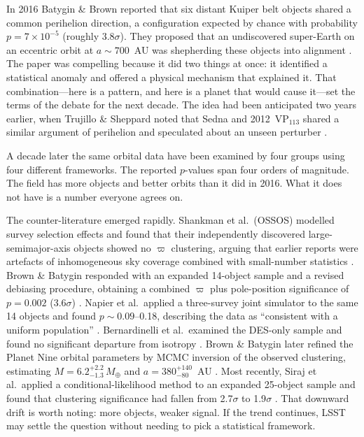 \documentclass[usenatbib]{mnras}
\begin{document}
In 2016 Batygin \& Brown reported that six distant Kuiper belt objects shared a common perihelion direction, a configuration expected by chance with probability $p=7\times10^{-5}$ (roughly 3.8$\sigma$). They proposed that an undiscovered super-Earth on an eccentric orbit at $a\sim700$~AU was shepherding these objects into alignment \cite{batygin2016}. The paper was compelling because it did two things at once: it identified a statistical anomaly and offered a physical mechanism that explained it. That combination---here is a pattern, and here is a planet that would cause it---set the terms of the debate for the next decade. The idea had been anticipated two years earlier, when Trujillo \& Sheppard noted that Sedna and 2012~VP$_{113}$ shared a similar argument of perihelion and speculated about an unseen perturber \cite{trujillo2014}.

A decade later the same orbital data have been examined by four groups using four different frameworks. The reported $p$-values span four orders of magnitude. The field has more objects and better orbits than it did in 2016. What it does not have is a number everyone agrees on.

The counter-literature emerged rapidly. Shankman et al.\ (OSSOS) modelled survey selection effects and found that their independently discovered large-semimajor-axis objects showed no $\varpi$ clustering, arguing that earlier reports were artefacts of inhomogeneous sky coverage combined with small-number statistics \cite{shankman2017}. Brown \& Batygin responded with an expanded 14-object sample and a revised debiasing procedure, obtaining a combined $\varpi$ plus pole-position significance of $p=0.002$ (3.6$\sigma$) \cite{brown2019}. Napier et al.\ applied a three-survey joint simulator to the same 14 objects and found $p\sim0.09$--0.18, describing the data as ``consistent with a uniform population'' \cite{napier2021}. Bernardinelli et al.\ examined the DES-only sample and found no significant departure from isotropy \cite{bernardinelli2020}. Brown \& Batygin later refined the Planet Nine orbital parameters by MCMC inversion of the observed clustering, estimating $M = 6.2^{+2.2}_{-1.3}\,M_\oplus$ and $a = 380^{+140}_{-80}$~AU \cite{brown2021}. Most recently, Siraj et al.\ applied a conditional-likelihood method to an expanded 25-object sample and found that clustering significance had fallen from 2.7$\sigma$ to 1.9$\sigma$ \cite{siraj2025,siraj2026}. That downward drift is worth noting: more objects, weaker signal. If the trend continues, LSST may settle the question without needing to pick a statistical framework.
\end{document}
